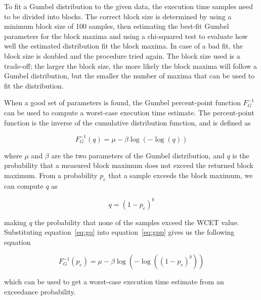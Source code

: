 To fit a Gumbel distribution to the given data, the execution time samples need to be divided into blocks. The correct block size is determined by using a minimum block size of 100 samples, then estimating the best-fit Gumbel parameters for the block maxima and using a chi-squared test to evaluate how well the estimated distribution fit the block maxima. In case of a bad fit, the block size is doubled and the procedure tried again. The block size used is a trade-off; the larger the block size, the more likely the block maxima will follow a Gumbel distribution, but the smaller the number of maxima that can be used to fit the distribution.

When a good set of parameters is found, the Gumbel percent-point function $F_G^{-1}$ can be used to compute a worst-case execution time estimate. The percent-point function is the inverse of the cumulative distribution function, and is defined as

\begin{equation}\label{eq:gpp}
    F_G^{-1}(q) = \mu - \beta \log(-\log (q))   
\end{equation}

\noindent where $\mu$ and $\beta$ are the two parameters of the Gumbel distribution, and $q$ is the probability that a measured block maximum does not exceed the returned block maximum. From a probability $p_e$ that a sample exceeds the block maximum, we can compute $q$ as

\begin{equation}\label{eq:gq}
    q = (1 - p_e)^b 
\end{equation}

\noindent making $q$ the probability that none of the samples exceed the WCET value. Substituting equation~\ref{eq:gq} into equation~\ref{eq:gpp} gives us the following equation

\begin{equation}
    F_G^{-1}(p_e) = \mu - \beta \log(-\log ((1 - p_e)^b))
\end{equation}

\noindent which can be used to get a worst-case execution time estimate from an exceedance probability.

